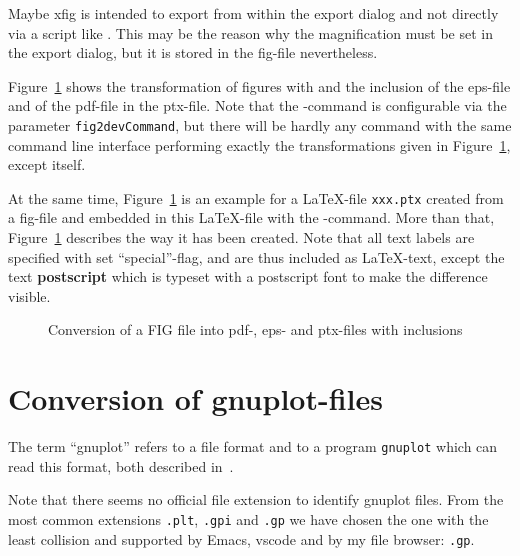 Maybe xfig is intended to export from within the export dialog 
and not directly via a script like . 
This may be the reason 
why the magnification must be set in the export dialog, 
but it is stored in the fig-file nevertheless. 

Figure~\ref{fig:fig2dev} shows the transformation 
of figures with  
and the inclusion of the eps-file and of the pdf-file in the ptx-file. 
Note that the -command is configurable 
via the parameter \texttt{fig2devCommand}, 
but there will be hardly any command with the same command line interface 
performing exactly the transformations given in Figure~\ref{fig:fig2dev}, 
except  itself. 

At the same time, Figure~\ref{fig:fig2dev} is an example 
for a \LaTeX-file \texttt{xxx.ptx} created from a fig-file 
and embedded in this \LaTeX-file 
with the -command. 
More than that, 
Figure~\ref{fig:fig2dev} describes the way it has been created. 
Note that all text labels are specified with set ``special''-flag, 
and are thus included as \LaTeX-text, 
except the text \textbf{\tiny postscript} 
which is typeset with a postscript font to make the difference visible. 


\begin{figure}[htb]
\centering
{}
\caption{\label{fig:fig2dev}Conversion of a FIG file 
into pdf-, eps- and ptx-files with inclusions}
\end{figure}


\section{Conversion of gnuplot-files}\label{sec:gnuplot2dev}

The term ``gnuplot'' refers to a file format
and to a program \texttt{gnuplot}
which can read this format, both described in~\cite{GnuPlot6_0}. 

Note that there seems no official file extension 
to identify gnuplot files. 
From the most common extensions \texttt{.plt}, \texttt{.gpi} and \texttt{.gp} 
we have chosen the one with the least collision 
and supported by Emacs, vscode and by my file browser: \texttt{.gp}. 

